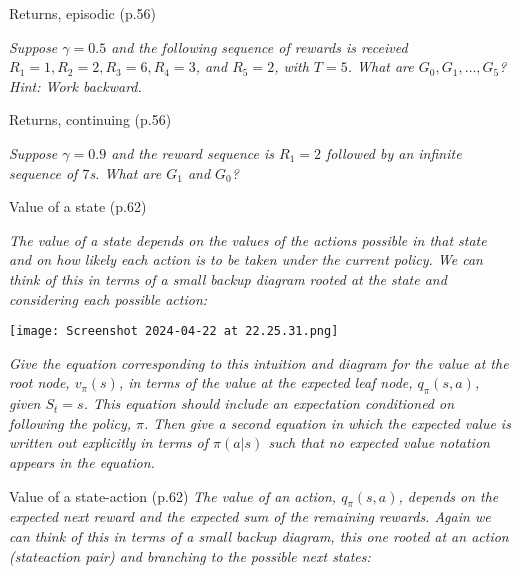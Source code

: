 \documentclass[12pt,letterpaper]{exam}
\begin{document}
\begin{questions}
	\question%
	Returns, episodic (p.56)

	\emph{Suppose \(\gamma=0.5\) and the following sequence of rewards is received 
	\(R_1 = 1, R_2 = 2, R_3 = 6, R_4 = 3\), and \(R_5 = 2\), with \(T = 5\). What are \(G_0, G_1, \ldots, G_5\)? 
	Hint: Work backward.}
	\begin{solution}
	\end{solution}

	\setcounter{question}{9-1}%
	\question%
	Returns, continuing (p.56)

	\emph{Suppose \(\gamma=0.9\) and the reward sequence is \(R_1 = 2\) followed by an infinite sequence of \(7\)s. 
	What are \(G_1\) and \(G_0\)?}
	\begin{solution}
	\end{solution}

	\setcounter{question}{18-1}%
	\question%
	Value of a state (p.62)

	\emph{The value of a state depends on the values of the actions possible in that 
	state and on how likely each action is to be taken under the current policy. 
	We can think of this in terms of a small backup diagram rooted at the state and considering each possible action:}

	\texttt{[image: Screenshot 2024-04-22 at 22.25.31.png]}%

	\emph{Give the equation corresponding to this intuition and diagram for the value at the root node, \(v_\pi(s)\), 
	in terms of the value at the expected leaf node, \(q_\pi(s, a)\), given \(S_t = s\).
	This equation should include an expectation conditioned on following the policy, \(\pi\). 
	Then give a second equation in which the expected value is written out explicitly in terms of \(\pi(a|s)\) 
	such that no expected value notation appears in the equation.}
	\begin{solution}
	\end{solution}

	\question%
	Value of a state-action (p.62)
	\emph{The value of an action, \(q_\pi(s, a)\), depends on the expected next reward and the expected sum of the remaining rewards. 
	Again we can think of this in terms of a small backup diagram, this one rooted at an action (state\-action pair) 
	and branching to the possible next states:}
	

\end{questions}
\end{document}

